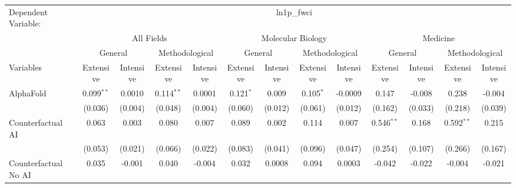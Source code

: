 \begingroup
\centering
\begin{tabular}{lcccccccccccc}
   \tabularnewline \midrule \midrule
   Dependent Variable: & \multicolumn{12}{c}{ln1p\_fwci}\\
 & \multicolumn{4}{c}{All Fields} & \multicolumn{4}{c}{Molecular Biology} & \multicolumn{4}{c}{Medicine} \\
\cmidrule(lr){2-5} \cmidrule(lr){6-9} \cmidrule(lr){10-13}
 & \multicolumn{2}{c}{General} & \multicolumn{2}{c}{Methodological} & \multicolumn{2}{c}{General} & \multicolumn{2}{c}{Methodological} & \multicolumn{2}{c}{General} & \multicolumn{2}{c}{Methodological} \\
\cmidrule(lr){2-3} \cmidrule(lr){4-5} \cmidrule(lr){6-7} \cmidrule(lr){8-9} \cmidrule(lr){10-11} \cmidrule(lr){12-13}
Variables & \multicolumn{1}{c}{Extensive} & \multicolumn{1}{c}{Intensive} & \multicolumn{1}{c}{Extensive} & \multicolumn{1}{c}{Intensive} & \multicolumn{1}{c}{Extensive} & \multicolumn{1}{c}{Intensive} & \multicolumn{1}{c}{Extensive} & \multicolumn{1}{c}{Intensive} & \multicolumn{1}{c}{Extensive} & \multicolumn{1}{c}{Intensive} & \multicolumn{1}{c}{Extensive} & \multicolumn{1}{c}{Intensive} \\
\cmidrule(lr){1-1}\cmidrule(lr){2-2} \cmidrule(lr){3-3} \cmidrule(lr){4-4} \cmidrule(lr){5-5} \cmidrule(lr){6-6} \cmidrule(lr){7-7} \cmidrule(lr){8-8} \cmidrule(lr){9-9} \cmidrule(lr){10-10} \cmidrule(lr){11-11} \cmidrule(lr){12-12} \cmidrule(lr){13-13}
   AlphaFold                                & 0.099$^{**}$ & 0.0010      & 0.114$^{**}$ & 0.0001      & 0.121$^{*}$ & 0.009       & 0.105$^{*}$ & -0.0009  & 0.147        & -0.008  & 0.238        & -0.004\\   
                                            & (0.036)      & (0.004)     & (0.048)      & (0.004)     & (0.060)     & (0.012)     & (0.061)     & (0.012)  & (0.162)      & (0.033) & (0.218)      & (0.039)\\   
   Counterfactual AI                        & 0.063        & 0.003       & 0.080        & 0.007       & 0.089       & 0.002       & 0.114       & 0.007    & 0.546$^{**}$ & 0.168   & 0.592$^{**}$ & 0.215\\   
                                            & (0.053)      & (0.021)     & (0.066)      & (0.022)     & (0.083)     & (0.041)     & (0.096)     & (0.047)  & (0.254)      & (0.107) & (0.266)      & (0.167)\\   
   Counterfactual No AI                     & 0.035        & -0.001      & 0.040        & -0.004      & 0.032       & 0.0008      & 0.094       & 0.0003   & -0.042       & -0.022  & -0.004       & -0.021\\   

\end{tabular}

